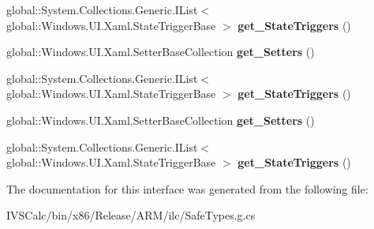 \begin{DoxyCompactItemize}
\mbox{\label{interface_windows_1_1_u_i_1_1_xaml_1_1_i_visual_state2_ae75ceca48a5fb3f4f83a14db3035df89}} 
global\+::\+System.\+Collections.\+Generic.\+I\+List$<$ global\+::\+Windows.\+U\+I.\+Xaml.\+State\+Trigger\+Base $>$ {\bfseries get\+\_\+\+State\+Triggers} ()
\item 
\mbox{\label{interface_windows_1_1_u_i_1_1_xaml_1_1_i_visual_state2_a76685d6c9814d665e4399a7b89aedc0d}} 
global\+::\+Windows.\+U\+I.\+Xaml.\+Setter\+Base\+Collection {\bfseries get\+\_\+\+Setters} ()
\item 
\mbox{\label{interface_windows_1_1_u_i_1_1_xaml_1_1_i_visual_state2_ae75ceca48a5fb3f4f83a14db3035df89}} 
global\+::\+System.\+Collections.\+Generic.\+I\+List$<$ global\+::\+Windows.\+U\+I.\+Xaml.\+State\+Trigger\+Base $>$ {\bfseries get\+\_\+\+State\+Triggers} ()
\item 
\mbox{\label{interface_windows_1_1_u_i_1_1_xaml_1_1_i_visual_state2_a76685d6c9814d665e4399a7b89aedc0d}} 
global\+::\+Windows.\+U\+I.\+Xaml.\+Setter\+Base\+Collection {\bfseries get\+\_\+\+Setters} ()
\item 
\mbox{\label{interface_windows_1_1_u_i_1_1_xaml_1_1_i_visual_state2_ae75ceca48a5fb3f4f83a14db3035df89}} 
global\+::\+System.\+Collections.\+Generic.\+I\+List$<$ global\+::\+Windows.\+U\+I.\+Xaml.\+State\+Trigger\+Base $>$ {\bfseries get\+\_\+\+State\+Triggers} ()
\end{DoxyCompactItemize}


The documentation for this interface was generated from the following file\+:\begin{DoxyCompactItemize}
\item 
I\+V\+S\+Calc/bin/x86/\+Release/\+A\+R\+M/ilc/Safe\+Types.\+g.\+cs\end{DoxyCompactItemize}

